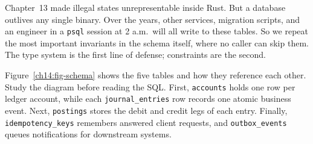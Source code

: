 Chapter~13 made illegal states unrepresentable inside Rust. But a database outlives any single binary. Over the years, other services, migration scripts, and an engineer in a \texttt{psql} session at 2 a.m.\ will all write to these tables. So we repeat the most important invariants in the schema itself, where no caller can skip them. The type system is the first line of defense; constraints are the second.

Figure~\ref{ch14:fig-schema} shows the five tables and how they reference each other. Study the diagram before reading the SQL. First, \texttt{accounts} holds one row per ledger account, while each \texttt{journal\_entries} row records one atomic business event. Next, \texttt{postings} stores the debit and credit legs of each entry. Finally, \texttt{idempotency\_keys} remembers answered client requests, and \texttt{outbox\_events} queues notifications for downstream systems.


